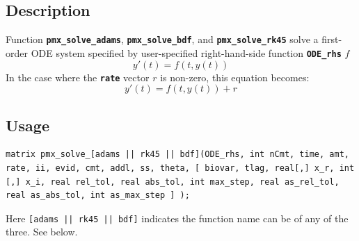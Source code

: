 \documentclass[10pt, reqno, oneside]{amsbook}
\numberwithin{equation}{chapter}
\numberwithin{figure}{chapter}
\numberwithin{table}{chapter}
\theoremstyle{remark}
\begin{document}
\subsection{Description}
\label{sec:org9970278}
Function {\small \color{MRGGreen} \texttt{\textbf{pmx\_solve\_adams}}}, {\small \color{MRGGreen} \texttt{\textbf{pmx\_solve\_bdf}}}, and {\small \color{MRGGreen} \texttt{\textbf{pmx\_solve\_rk45}}} solve a first-order ODE system
specified by user-specified right-hand-side function {\small \color{MRGGreen} \texttt{\textbf{ODE\_rhs}}} \(f\)
\begin{equation*}
y'(t) = f(t, y(t))
\end{equation*}
In the case where the {\small \color{MRGGreen} \texttt{\textbf{rate}}} vector \(r\) is non-zero, this equation becomes:
\begin{equation*}
y'(t) = f(t, y(t)) + r
\end{equation*}
\subsection{Usage}
\label{sec:orgb6c34b5}
\begin{verbatim}
matrix pmx_solve_[adams || rk45 || bdf](ODE_rhs, int nCmt, time, amt, rate, ii, evid, cmt, addl, ss, theta, [ biovar, tlag, real[,] x_r, int [,] x_i, real rel_tol, real abs_tol, int max_step, real as_rel_tol, real as_abs_tol, int as_max_step ] );
\end{verbatim}
Here \texttt{[adams || rk45 || bdf]} indicates the
function name can be of any of the three. See below.
\end{document}
